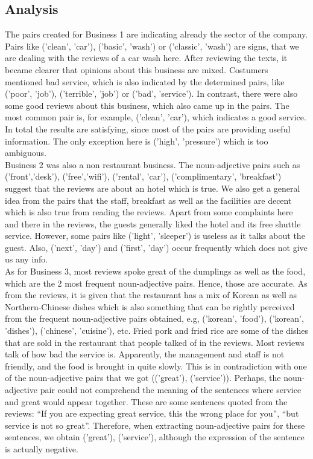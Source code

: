 \subsection{Analysis}
The pairs created for Business 1 are indicating already the sector of the company. Pairs like ('clean', 'car'), ('basic', 'wash') or ('classic', 'wash') are signs, that we are dealing with the reviews of a car wash here. After reviewing the texts, it became clearer that opinions about this business are mixed. Costumers mentioned bad service, which is also indicated by the determined pairs, like ('poor', 'job'), ('terrible', 'job') or ('bad', 'service'). In contrast, there were also some good reviews about this business, which also came up in the pairs. The most common pair is, for example, ('clean', 'car'), which indicates a good service. In total the results are satisfying, since most of the pairs are providing useful information. The only exception here is ('high', 'pressure') which is too ambiguous.\\
Business 2 was also a non restaurant business. The noun-adjective pairs such as ('front’,’desk’), ('free’,’wifi’), ('rental’, 'car’), ('complimentary’, 'breakfast’) suggest that the reviews are about an hotel which is true. We also get a general idea from the pairs that the staff, breakfast as well as the facilities are decent which is also true from reading the reviews. Apart from some complaints here and there in the reviews, the guests generally liked the hotel and its free shuttle service. However, some pairs like ('light’, 'sleeper’) is useless as it talks about the guest. Also, ('next’, 'day’) and ('first’, 'day’) occur frequently which does not give us any info.\\
As for Business 3, most reviews spoke great of the dumplings as well as the food, which are the 2 most frequent noun-adjective pairs. Hence, those are accurate. As from the reviews, it is given that the restaurant has a mix of Korean as well as Northern-Chinese dishes which is also something that can be rightly perceived from the frequent noun-adjective pairs obtained, e.g, ('korean’, 'food’), ('korean’, 'dishes’), ('chinese’, 'cuisine’), etc. Fried pork and fried rice are some of the dishes that are sold in the restaurant that people talked of in the reviews. Most reviews talk of how bad the service is. Apparently, the management and staff is not friendly, and the food is brought in quite slowly. This is in contradiction with one of the noun-adjective pairs that we got (('great’), ('service’)).  Perhaps, the noun-adjective pair could not comprehend the meaning of the sentences where service and great would appear together. These are some sentences quoted from the reviews: “If you are expecting great service, this the wrong place for you”, “but service is not so great”.  Therefore, when extracting noun-adjective pairs for these sentences, we obtain ('great’), ('service’), although the expression of the sentence is actually negative.\\
